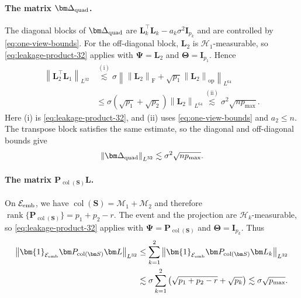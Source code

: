 \documentclass[11pt]{article}
\newcommand{\ind}{\bm{1}}
\newcommand{\trans}{\top}
\DeclareMathOperator{\col}{col}
\DeclareMathOperator{\rank}{rank}
\newcommand{\opn}[1]{\left\lVert #1\right\rVert_{\mathrm{op}}}
\newcommand{\frn}[1]{\left\lVert #1\right\rVert_{\mathrm{F}}}
\newcommand{\Lqn}[2]{\left\lVert #1\right\rVert_{L^{#2}}}
\newcommand{\cM}{\mathcal{M}}
\newcommand{\cE}{\mathcal{E}}
\newcommand{\Hc}{\mathcal{H}}
\begin{document}
\paragraph{The matrix $\bm\Delta_{\rm quad}$.}
The diagonal blocks of $\bm\Delta_{\rm quad}$ are
$\bm L_k^\trans\bm L_k-a_k\sigma^2\bm I_{p_k}$ and are controlled by
\cref{eq:one-view-bounds}. For the off-diagonal block,
$\bm L_2$ is $\Hc_1$-measurable, so
\cref{eq:leakage-product-32} applies with
$\bm\Psi=\bm L_2$ and $\bm\Theta=\bm I_{p_1}$. Hence
\[
\begin{aligned}
  \Lqn{\bm L_2^\trans\bm L_1}{32}
  &\overset{\mathrm{(i)}}{\lesssim}
  \sigma
  \left\|
    \frn{\bm L_2}+\sqrt{p_1}\opn{\bm L_2}
  \right\|_{L^{64}} \\
  &\le
  \sigma(\sqrt{p_1}+\sqrt{p_2})\Lqn{\bm L_2}{64}
  \overset{\mathrm{(ii)}}{\lesssim}
  \sigma^2\sqrt{np_{\max}}.
\end{aligned}
\]
Here (i) is \cref{eq:leakage-product-32}, and (ii) uses
\cref{eq:one-view-bounds} and $a_2\le n$. The transpose block satisfies
the same estimate, so the diagonal and off-diagonal bounds give
\begin{equation}
\label{eq:quad-moment}
  \Lqn{\bm\Delta_{\rm quad}}{32}
  \lesssim
  \sigma^2\sqrt{np_{\max}}.
\end{equation}

\paragraph{The matrix $\bm P_{\col(\bm S)}\bm L$.}
On $\cE_{\rm emb}$, we have
$\col(\bm S)=\cM_1+\cM_2$ and therefore
$\rank\{\bm P_{\col(\bm S)}\}=p_1+p_2-r$. The event and the projection
are $\Hc_k$-measurable, so
\cref{eq:leakage-product-32} applies with
$\bm\Psi=\bm P_{\col(\bm S)}$ and
$\bm\Theta=\bm I_{p_k}$. Thus
\begin{align}
  \Lqn{
    \ind_{\cE_{\rm emb}}
    \bm P_{\col(\bm S)}\bm L
  }{32}
  &\le
  \sum_{k=1}^2
  \Lqn{
    \ind_{\cE_{\rm emb}}
    \bm P_{\col(\bm S)}\bm L_k
  }{32} \nonumber \\
  &\lesssim
  \sigma\sum_{k=1}^2
  \left(
    \sqrt{p_1+p_2-r}+\sqrt{p_k}
  \right)
  \lesssim
  \sigma\sqrt{p_{\max}}.\label{eq:projected-leakage}
\end{align}
\end{document}
